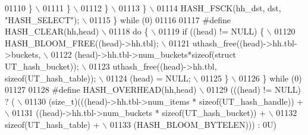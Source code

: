 \begin{DoxyCode}
{{{{{{{{{01110 \textcolor{preprocessor}{        \}                                                                        \(\backslash\)}
01111 \textcolor{preprocessor}{      \}                                                                          \(\backslash\)}
01112 \textcolor{preprocessor}{    \}                                                                            \(\backslash\)}
01113 \textcolor{preprocessor}{  \}                                                                              \(\backslash\)}
01114 \textcolor{preprocessor}{  HASH\_FSCK(hh\_dst, dst, "HASH\_SELECT");                                         \(\backslash\)}
01115 \textcolor{preprocessor}{\} while (0)}
01116 
01117 \textcolor{preprocessor}{#define HASH\_CLEAR(hh,head)                                                      \(\backslash\)}
01118 \textcolor{preprocessor}{do \{                                                                             \(\backslash\)}
01119 \textcolor{preprocessor}{  if ((head) != NULL) \{                                                          \(\backslash\)}
01120 \textcolor{preprocessor}{    HASH\_BLOOM\_FREE((head)->hh.tbl);                                             \(\backslash\)}
01121 \textcolor{preprocessor}{    uthash\_free((head)->hh.tbl->buckets,                                         \(\backslash\)}
01122 \textcolor{preprocessor}{                (head)->hh.tbl->num\_buckets*sizeof(struct UT\_hash\_bucket));      \(\backslash\)}
01123 \textcolor{preprocessor}{    uthash\_free((head)->hh.tbl, sizeof(UT\_hash\_table));                          \(\backslash\)}
01124 \textcolor{preprocessor}{    (head) = NULL;                                                               \(\backslash\)}
01125 \textcolor{preprocessor}{  \}                                                                              \(\backslash\)}
01126 \textcolor{preprocessor}{\} while (0)}
01127 
01128 \textcolor{preprocessor}{#define HASH\_OVERHEAD(hh,head)                                                   \(\backslash\)}
01129 \textcolor{preprocessor}{ (((head) != NULL) ? (                                                           \(\backslash\)}
01130 \textcolor{preprocessor}{ (size\_t)(((head)->hh.tbl->num\_items   * sizeof(UT\_hash\_handle))   +             \(\backslash\)}
01131 \textcolor{preprocessor}{          ((head)->hh.tbl->num\_buckets * sizeof(UT\_hash\_bucket))   +             \(\backslash\)}
01132 \textcolor{preprocessor}{           sizeof(UT\_hash\_table)                                   +             \(\backslash\)}
01133 \textcolor{preprocessor}{           (HASH\_BLOOM\_BYTELEN))) : 0U)}
}}}}}}}}}
\end{DoxyCode}
